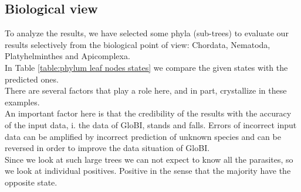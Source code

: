     \subsection{Biological view}
      To analyze the results, we have selected some phyla (sub-trees) to evaluate our results 
        selectively from the biological point of view: Chordata, Nematoda, Platyhelminthes and 
        Apicomplexa. \\
      In Table \ref{table:phylum leaf nodes states} we compare the given states with the predicted ones. \\
      There are several factors that play a role here, and in part, crystallize in these examples. \\
      An important factor here is that the credibility of the results with the accuracy of the input 
        data, i. the data of GloBI, stands and falls. Errors of incorrect input data can be amplified by 
        incorrect prediction of unknown species and can be reversed in order to improve the data 
        situation of GloBI. \\
      Since we look at such large trees we can not expect to know all the parasites, so we look at 
        individual positives. Positive in the sense that the majority have the opposite state.

